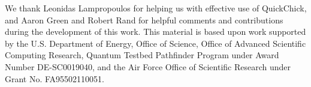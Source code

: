 \documentclass[format=acmsmall, screen=true,review,anonymous, nonacm,pdftex,svgnames]{acmart}
\begin{document}
\begin{acks}                            %
We thank Leonidas Lampropoulos for helping us with effective use of
QuickChick, and Aaron Green and Robert Rand for helpful comments and contributions
during the development of this work. This material is based upon work supported
by the U.S. Department of 
Energy, Office of Science, Office of Advanced Scientific Computing
Research, Quantum Testbed Pathfinder Program under Award Number
DE-SC0019040, and the Air Force Office of Scientific Research under Grant No.
FA95502110051.
\end{acks}



\newpage

\end{document}
